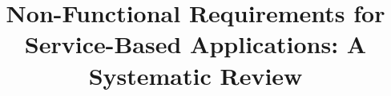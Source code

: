 \documentclass{sig-alternate}
\begin{document}
 
%
  
 
\title{Non-Functional Requirements for Service-Based Applications: A Systematic Review}

%
%
%
%
%
\end{document}
